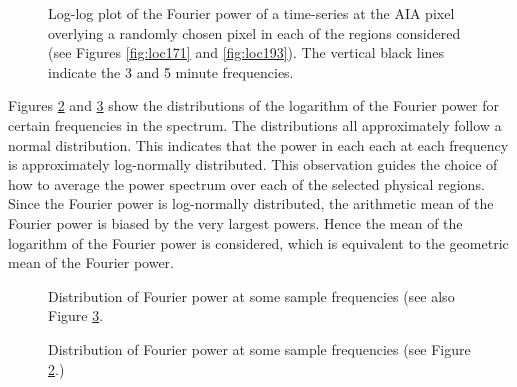 \documentclass[manuscript]{../aastex52/aastex}
\begin{document}
\begin{figure}
\label{fig:compare171193}
\caption{Log-log plot of the Fourier power of a time-series at the AIA
  pixel overlying a randomly chosen pixel in each of the regions
  considered (see Figures \protect\ref{fig:loc171} and
  \protect\ref{fig:loc193}).  The vertical black lines indicate the 3
  and 5 minute frequencies.}
\end{figure}


Figures \ref{fig:dist171} and \ref{fig:dist193} show the distributions
of the logarithm of the Fourier power for certain frequencies in the
spectrum.  The distributions all approximately follow a normal
distribution.  This indicates that the power in each each at each
frequency is approximately log-normally distributed.  This observation
guides the choice of how to average the power spectrum over each of
the selected physical regions.  Since the Fourier power is
log-normally distributed, the arithmetic mean of the Fourier power is
biased by the very largest powers.  Hence the mean of the logarithm of
the Fourier power is considered, which is equivalent to the geometric
mean of the Fourier power.

\begin{figure}
\label{fig:dist171}
\caption{Distribution of Fourier power at some sample frequencies (see also Figure \ref{fig:dist193}.}
\end{figure}

\begin{figure}
\label{fig:dist193}
\caption{Distribution of Fourier power at some sample frequencies (see Figure \ref{fig:dist171}.)}
\end{figure}
\end{document}
